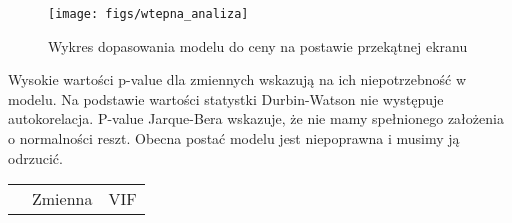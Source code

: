 \documentclass[11pt,a4paper]{article}
\begin{document}
		 \begin{figure}[h]
		 	\centering
		 	\texttt{[image: figs/wtepna\_analiza]}
		 	\caption[wstepna]{Wykres dopasowania modelu do ceny na postawie przekątnej ekranu}
		 	\label{fig:wtepnaanaliza}
		 \end{figure}
	Wysokie wartości p-value dla zmiennych wskazują na ich niepotrzebność w modelu. Na podstawie wartości statystki 
	 Durbin-Watson nie występuje autokorelacja. P-value Jarque-Bera wskazuje, że nie mamy spełnionego założenia o normalności reszt. Obecna postać modelu jest niepoprawna i musimy ją odrzucić. 
	 
		 \begin{center}
			 \begin{tabular}{llr}
			 	 
		 	{} &                  	Zmienna &           VIF \\
			 	 

\end{tabular}
\end{center}
\end{document}
